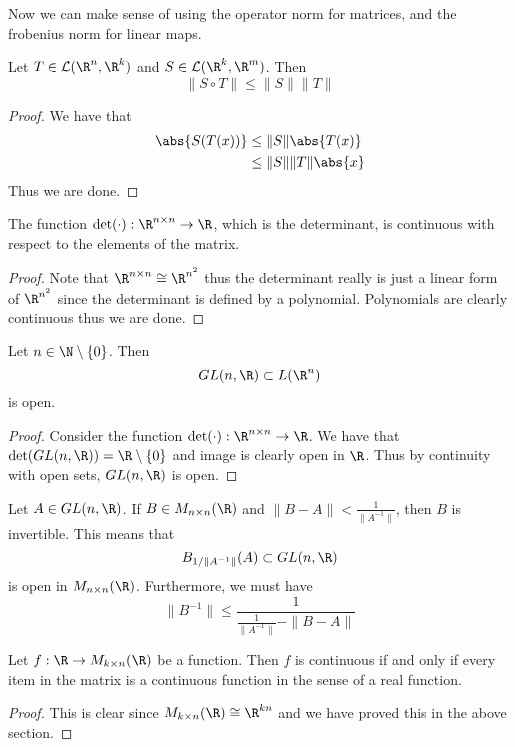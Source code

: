 \documentclass[a4paper]{article}
\begin{document}
Now we can make sense of using the operator norm for matrices, and the frobenius norm for linear maps. 

\begin{prp}{}{} Let $T\in\mathcal{L}(\R^n,\R^k)$ and $S\in\mathcal{L}(\R^k,\R^m)$. Then $$\|S\circ T\|\leq\|S\|\|T\|$$ \tcbline
\begin{proof}
We have that 
\begin{align*}
\abs{S(T(x))}&\leq\|S\|\abs{T(x)}\\
&\leq\|S\|\|T\|\abs{x}
\end{align*}
Thus we are done. 
\end{proof}
\end{prp}

\begin{prp}{}{} The function $\det(\cdot):\R^{n\times n}\to\R$, which is the determinant, is continuous with respect to the elements of the matrix. \tcbline
\begin{proof}
Note that $\R^{n\times n}\cong\R^{n^2}$ thus the determinant really is just a linear form of $\R^{n^2}$ since the determinant is defined by a polynomial. Polynomials are clearly continuous thus we are done. 
\end{proof}
\end{prp}

\begin{prp}{}{} Let $n\in\N\setminus\{0\}$. Then $$GL(n,\R)\subset L(\R^n)$$ is open. \tcbline
\begin{proof}
Consider the function $\det(\cdot):\R^{n\times n}\to\R$. We have that $\det(GL(n,\R))=\R\setminus\{0\}$ and image is clearly open in $\R$. Thus by continuity with open sets, $GL(n,\R)$ is open. 
\end{proof}
\end{prp}

\begin{prp}{}{} Let $A\in GL(n,\R)$. If $B\in M_{n\times n}(\R)$ and $\|B-A\|<\frac{1}{\|A^{-1}\|}$, then $B$ is invertible. This means that $$B_{1/\|A^{-1}\|}(A)\subset GL(n,\R)$$ is open in $M_{n\times n}(\R)$. Furthermore, we must have $$\|B^{-1}\|\leq\frac{1}{\frac{1}{\|A^{-1}\|}-\|B-A\|}$$
\end{prp}

\begin{prp}{}{} Let $f:\R\to M_{k\times n}(\R)$ be a function. Then $f$ is continuous if and only if every item in the matrix is a continuous function in the sense of a real function. \tcbline
\begin{proof}
This is clear since $M_{k\times n}(\R)\cong\R^{kn}$ and we have proved this in the above section. 
\end{proof}
\end{prp}
\end{document}
